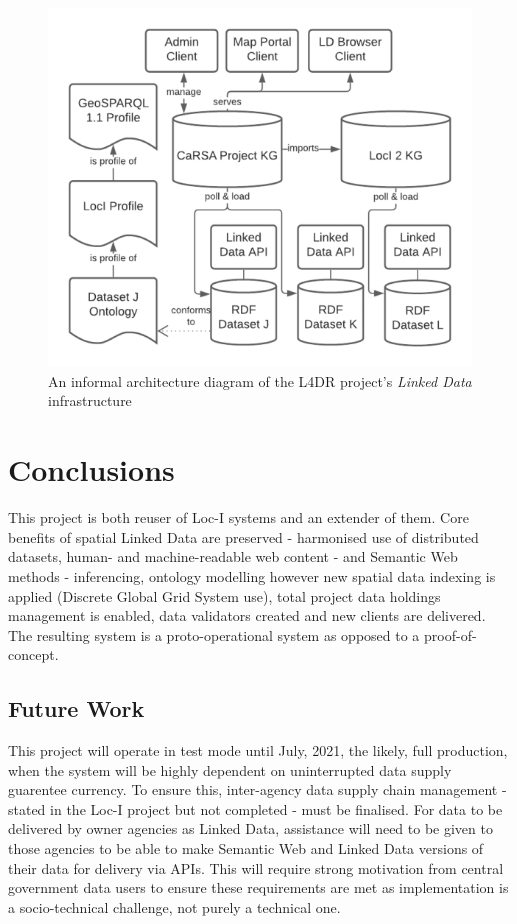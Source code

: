 \documentclass[runningheads]{llncs}
\begin{document}
\begin{figure}[htb]
    \centering
    \includegraphics[width=0.8\linewidth]{images/l4dr-arch.png}
    \caption{An informal architecture diagram of the L4DR project's \textit{Linked Data} infrastructure}
    \label{fig:l4dr-arch}
\end{figure}


\section{Conclusions}\label{sec:conclusions}
This project is both reuser of Loc-I systems and an extender of them. Core benefits of spatial Linked Data are preserved - harmonised use of distributed datasets, human- and machine-readable 
web content - and Semantic Web methods - inferencing, ontology modelling however new spatial data indexing is applied (Discrete Global Grid System use), total project data holdings management is
enabled, data validators created and new clients are delivered. The resulting system is a proto-operational system as opposed to a proof-of-concept.


\subsection{Future Work}\label{sec:futurework}
This project will operate in test mode until July, 2021, the likely, full production, when the system will be highly dependent on 
uninterrupted data supply guarentee currency. To ensure this, inter-agency data supply chain management - stated in the Loc-I project but not completed - 
must be finalised. For data to be delivered by owner agencies as Linked Data, assistance will need to be given to those agencies to be able to make Semantic Web and Linked Data versions of their data
for delivery via APIs. This will require strong motivation from central government data users to ensure these requirements are met as implementation is a socio-technical challenge, not purely a 
technical one.
\end{document}
